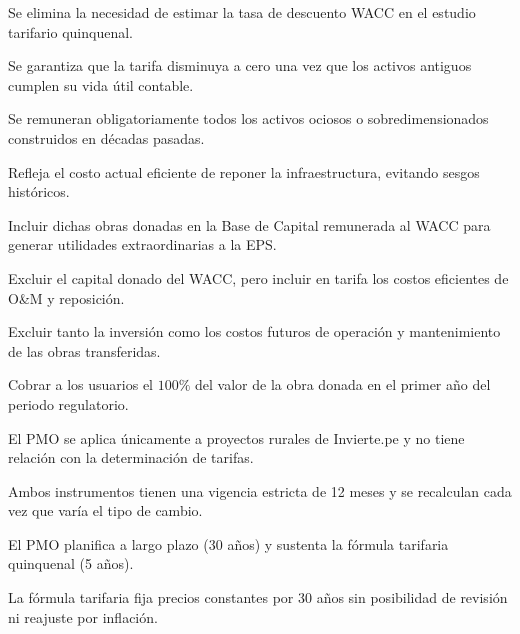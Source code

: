 \begin{opts}
    \item Se elimina la necesidad de estimar la tasa de descuento WACC en el estudio tarifario quinquenal.
    \item Se garantiza que la tarifa disminuya a cero una vez que los activos antiguos cumplen su vida útil contable.
    \item Se remuneran obligatoriamente todos los activos ociosos o sobredimensionados construidos en décadas pasadas.
    \item Refleja el costo actual eficiente de reponer la infraestructura, evitando sesgos históricos.
\end{opts}

\begin{opts}
    \item Incluir dichas obras donadas en la Base de Capital remunerada al WACC para generar utilidades extraordinarias a la EPS.
    \item Excluir el capital donado del WACC, pero incluir en tarifa los costos eficientes de O\&M y reposición.
    \item Excluir tanto la inversión como los costos futuros de operación y mantenimiento de las obras transferidas.
    \item Cobrar a los usuarios el $100\%$ del valor de la obra donada en el primer año del periodo regulatorio.
\end{opts}

\begin{opts}
    \item El PMO se aplica únicamente a proyectos rurales de Invierte.pe y no tiene relación con la determinación de tarifas.
    \item Ambos instrumentos tienen una vigencia estricta de 12 meses y se recalculan cada vez que varía el tipo de cambio.
    \item El PMO planifica a largo plazo (30 años) y sustenta la fórmula tarifaria quinquenal (5 años).
    \item La fórmula tarifaria fija precios constantes por 30 años sin posibilidad de revisión ni reajuste por inflación.
\end{opts}


